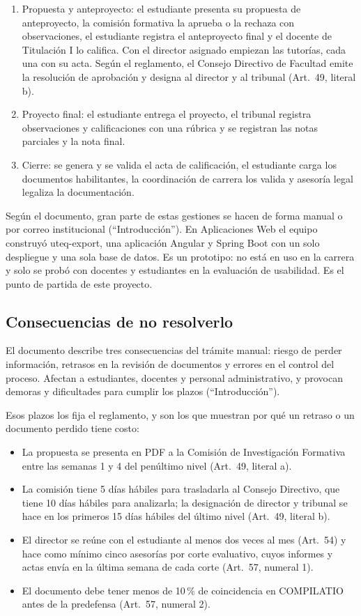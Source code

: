 \begin{enumerate}
  \item Propuesta y anteproyecto: el estudiante presenta su propuesta de anteproyecto, la comisión formativa la aprueba o la rechaza con observaciones, el estudiante registra el anteproyecto final y el docente de Titulación I lo califica. Con el director asignado empiezan las tutorías, cada una con su acta. Según el reglamento, el Consejo Directivo de Facultad emite la resolución de aprobación y designa al director y al tribunal (Art.~49, literal b).
  \item Proyecto final: el estudiante entrega el proyecto, el tribunal registra observaciones y calificaciones con una rúbrica y se registran las notas parciales y la nota final.
  \item Cierre: se genera y se valida el acta de calificación, el estudiante carga los documentos habilitantes, la coordinación de carrera los valida y asesoría legal legaliza la documentación.
\end{enumerate}

Según el documento, gran parte de estas gestiones se hacen de forma manual o por correo institucional (\enquote{Introducción}). En Aplicaciones Web el equipo construyó uteq-export, una aplicación Angular y Spring Boot con un solo despliegue y una sola base de datos. Es un prototipo: no está en uso en la carrera y solo se probó con docentes y estudiantes en la evaluación de usabilidad. Es el punto de partida de este proyecto.

\subsection{Consecuencias de no resolverlo}

El documento describe tres consecuencias del trámite manual: riesgo de perder información, retrasos en la revisión de documentos y errores en el control del proceso. Afectan a estudiantes, docentes y personal administrativo, y provocan demoras y dificultades para cumplir los plazos (\enquote{Introducción}).

Esos plazos los fija el reglamento, y son los que muestran por qué un retraso o un documento perdido tiene costo:

\begin{itemize}
  \item La propuesta se presenta en PDF a la Comisión de Investigación Formativa entre las semanas 1 y 4 del penúltimo nivel (Art.~49, literal a).
  \item La comisión tiene 5 días hábiles para trasladarla al Consejo Directivo, que tiene 10 días hábiles para analizarla; la designación de director y tribunal se hace en los primeros 15 días hábiles del último nivel (Art.~49, literal b).
  \item El director se reúne con el estudiante al menos dos veces al mes (Art.~54) y hace como mínimo cinco asesorías por corte evaluativo, cuyos informes y actas envía en la última semana de cada corte (Art.~57, numeral 1).
  \item El documento debe tener menos de 10\,\% de coincidencia en COMPILATIO antes de la predefensa (Art.~57, numeral 2).
\end{itemize}

